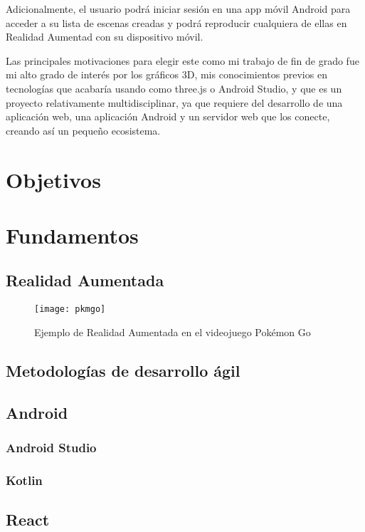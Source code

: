 Adicionalmente, el usuario podrá iniciar sesión en una app móvil Android para acceder a su lista de escenas creadas y podrá reproducir cualquiera de ellas en Realidad Aumentad con su dispositivo móvil.

Las principales motivaciones para elegir este como mi trabajo de fin de grado fue mi alto grado de interés por los gráficos 3D, mis conocimientos previos en tecnologías que acabaría usando como three.js o Android Studio, y que es un proyecto relativamente multidisciplinar, ya que requiere del desarrollo de una aplicación web, una aplicación Android y un servidor web que los conecte, creando así un pequeño ecosistema.

\section{Objetivos}

\section{Fundamentos}

\subsection{Realidad Aumentada}
\begin{figure}[h]
    \centering
    \texttt{[image: pkmgo]}
    \caption{Ejemplo de Realidad Aumentada en el videojuego Pokémon Go}
\end{figure}

\subsection{Metodologías de desarrollo ágil}

\subsection{Android}
\subsubsection{Android Studio}
\subsubsection{Kotlin}

\subsection{React}

